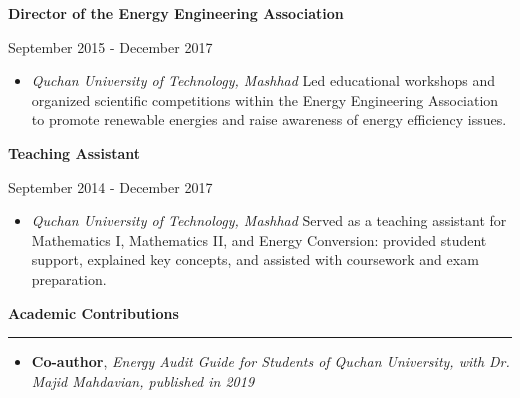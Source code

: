 \documentclass[a4paper]{letter}
\newcommand{\divider}{\rule{\linewidth}{0.9pt}}
\begin{document}
\begin{minipage}[t]{0.60\textwidth}
\vspace{ 2mm}
{\textbf{Director of the Energy Engineering Association}}

{\footnotesize September 2015 - December 2017}
\begin{itemize}
   \footnotesize \item \textit{Quchan University of Technology, Mashhad}
   \newline
   Led educational workshops and organized scientific competitions within the Energy Engineering Association to promote renewable energies and raise awareness of energy efficiency issues.
\end{itemize}

\vspace{ 2mm}

{\textbf{Teaching Assistant}}

{\footnotesize September 2014 - December 2017}
\begin{itemize}
    \footnotesize \item \textit{Quchan University of Technology, Mashhad}
    \newline
    Served as a teaching assistant for Mathematics I, Mathematics II, and Energy Conversion: provided student support, explained key concepts, and assisted with coursework and exam preparation.
\end{itemize}

\vspace{ 2mm}


{\large \textbf{Academic Contributions}}
\divider
\vspace{ 2mm}
\begin{itemize}
    \footnotesize \item {\textbf{Co-author}, \textit{Energy Audit Guide for Students of Quchan University, with Dr. Majid Mahdavian, published in 2019}}
\end{itemize}

\end{minipage}

\end{document}
